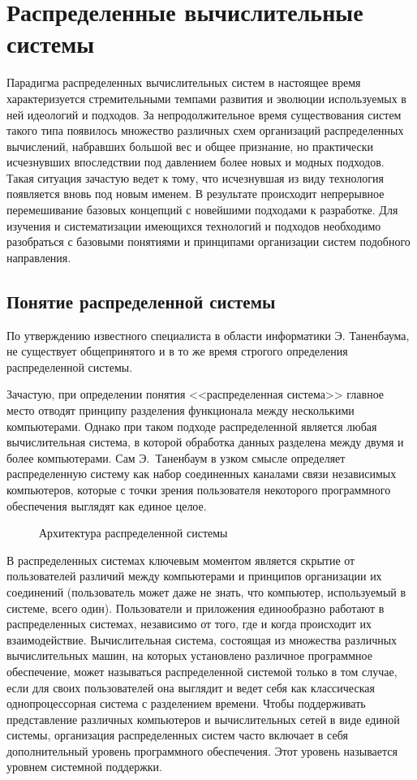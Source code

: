 \section{Распределенные вычислительные системы}
Парадигма распределенных вычислительных систем в настоящее время характеризуется стремительными темпами развития и эволюции используемых в ней идеологий и подходов. За непродолжительное время существования систем такого типа появилось множество различных схем организаций распределенных вычислений, набравших большой вес и общее признание, но практически исчезнувших впоследствии под давлением более новых и модных подходов. Такая ситуация зачастую ведет к тому, что исчезнувшая из виду технология появляется вновь под новым именем. В результате происходит непрерывное перемешивание базовых концепций с новейшими подходами к разработке. Для изучения и систематизации имеющихся технологий и подходов необходимо разобраться с базовыми понятиями и принципами организации систем подобного направления. 

\subsection{Понятие распределенной системы}
По утверждению известного специалиста в области информатики Э. Таненбаума, не существует общепринятого и в то же время строгого определения распределенной системы. 

Зачастую, при определении понятия <<распределенная система>> главное место отводят принципу разделения функционала между несколькими компьютерами. Однако при таком подходе распределенной является любая вычислительная система, в которой обработка данных разделена между двумя и более компьютерами. Сам Э.~Таненбаум в узком смысле определяет распределенную систему как набор соединенных каналами связи независимых компьютеров, которые с точки зрения пользователя некоторого программного обеспечения выглядят как единое целое.

\begin{figure}[h]
\caption{Архитектура распределенной системы}
\label{0:dcs}
\end{figure}

В распределенных системах ключевым моментом является скрытие от пользователей различий между компьютерами и принципов организации их соединений (пользователь может даже не знать, что компьютер, используемый в системе, всего один). Пользователи и приложения единообразно работают в распределенных системах, независимо от того, где и когда происходит их взаимодействие. Вычислительная система, состоящая из множества различных вычислительных машин, на которых установлено различное программное обеспечение, может называться распределенной системой только в том случае, если для своих пользователей она выглядит и ведет себя как классическая однопроцессорная система с разделением времени. Чтобы поддерживать представление различных компьютеров и вычислительных сетей в виде единой системы, организация распределенных систем часто включает в себя дополнительный уровень программного обеспечения. Этот уровень называется уровнем системной поддержки.

